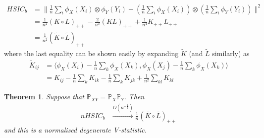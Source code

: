 \documentclass[]{article}
\newtheorem{theorem}{Theorem}
\begin{document}
\begin{align*}
HSIC_b & = \| \frac{1}{n}\sum_i \phi_X(X_i) \otimes \phi_Y(Y_i) - \left(\frac{1}{n}\sum_i \phi_X(X_i)\right) \otimes \left(\frac{1}{n}\sum_i \phi_Y(Y_i) \right)\|^2 \\
& = \frac{1}{n^2} (K\circ L)_{++}  - \frac{2}{n^3}(KL)_{++} + \frac{1}{n^4}K_{++}L_{++} \\
& = \frac{1}{n^2}(\tilde{K}\circ \tilde{L})_{++}
\end{align*}
where the last equality can be shown easily by expanding $\tilde{K}$ (and $\tilde{L}$ similarly) as
\begin{align*}
\tilde{K}_{ij} &= \langle\phi_X(X_i)- \frac{1}{n}\sum_k\phi_X(X_k),\phi_X(X_j) - \frac{1}{n}\sum_k\phi_X(X_k)\rangle \\
&= K_{ij} - \frac{1}{n}\sum_kK_{ik} - \frac{1}{n}\sum_kK_{jk} + \frac{1}{n^2}\sum_{kl}K_{kl}
\end{align*} 

\begin{theorem}
Suppose that $\mathbb{P}_{XY} = \mathbb{P}_X\mathbb{P}_Y$. Then 
\begin{align*}
nHSIC_b & \xrightarrow{O(n^{-\frac{1}{2}})} \frac{1}{n} (\bar{K}\circ \bar{L})_{++}
\end{align*}
and this is a normalised degenerate V-statistic.
\end{theorem}
\end{document}
